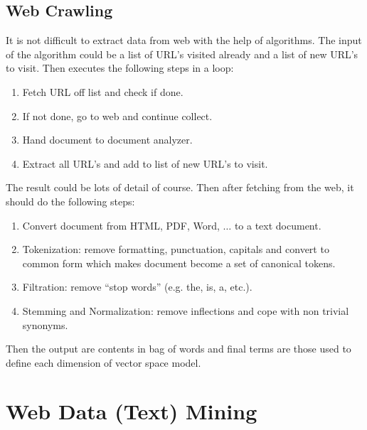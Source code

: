 \documentclass[sigconf]{acmart}
\begin{document}
\subsection{Web Crawling}

It is not difficult to extract data from web with the help of algorithms. The input of the algorithm could be a list of URL's visited already and a list of new URL's to visit. Then executes the following steps in a loop:
\begin{enumerate}
\item Fetch URL off list and check if done.
\item If not done, go to web and continue collect.
\item Hand document to document analyzer.
\item Extract all URL's and add to list of new URL's to visit.
\end{enumerate}
The result could be lots of detail of course. Then after fetching from the web, it should do the following steps:
\begin{enumerate}
\item Convert document from HTML, PDF, Word, $\ldots$ to a text document.
\item Tokenization: remove formatting, punctuation, capitals and convert to common form which makes document become a set of canonical tokens.
\item Filtration: remove ``stop words'' (e.g. the, is, a, etc.).
\item Stemming and Normalization: remove inflections and cope with non trivial synonyms.
\end{enumerate}
Then the output are contents in bag of words and final terms are those used to define each dimension of vector space model.

\section{Web Data (Text) Mining}
\end{document}
